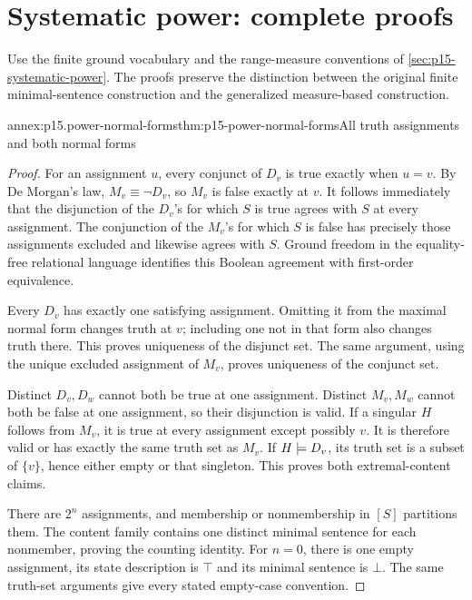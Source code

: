 \section{Systematic power: complete proofs}
\label{sec:annex-p15-systematic-power}

Use the finite ground vocabulary and the range-measure
conventions of \cref{sec:p15-systematic-power}.
The proofs preserve the distinction between the original
finite minimal-sentence construction and the generalized
measure-based construction.

\begin{annexitem}{annex:p15.power-normal-forms}{thm:p15-power-normal-forms}{All truth assignments and both normal forms}
\begin{proof}
For an assignment \(u\), every conjunct of \(D_v\)
is true exactly when \(u=v\). By De Morgan's law,
\(M_v\equiv\neg D_v\), so \(M_v\) is false
exactly at \(v\). It follows immediately that
the disjunction of the \(D_v\)'s for which
\(S\) is true agrees with \(S\) at every assignment.
The conjunction of the \(M_v\)'s for which
\(S\) is false has precisely those assignments
excluded and likewise agrees with \(S\).
Ground freedom in the equality-free relational
language identifies this Boolean agreement
with first-order equivalence.

Every \(D_v\) has exactly one satisfying
assignment. Omitting it from the maximal
normal form changes truth at \(v\);
including one not in that form also
changes truth there. This proves uniqueness
of the disjunct set. The same argument,
using the unique excluded assignment
of \(M_v\), proves uniqueness of the
conjunct set.

Distinct \(D_v,D_w\) cannot both be
true at one assignment. Distinct
\(M_v,M_w\) cannot both be false
at one assignment, so their disjunction
is valid. If a singular \(H\)
follows from \(M_v\), it is true
at every assignment except possibly
\(v\). It is therefore valid or
has exactly the same truth set
as \(M_v\). If \(H\models D_v\),
its truth set is a subset of
\(\{v\}\), hence either empty
or that singleton. This proves
both extremal-content claims.

There are \(2^n\) assignments,
and membership or nonmembership
in \([S]\) partitions them.
The content family contains one
distinct minimal sentence for
each nonmember, proving the
counting identity.
For \(n=0\), there is one empty
assignment, its state description
is \(\top\) and its minimal
sentence is \(\bot\).
The same truth-set arguments
give every stated empty-case
convention.
\end{proof}
\end{annexitem}

